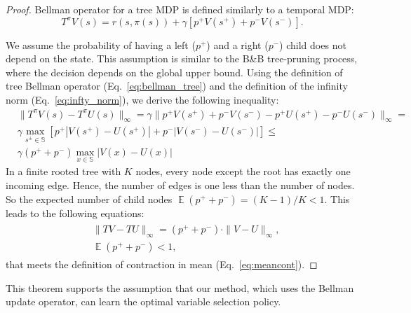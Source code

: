 \documentclass[preprint,12pt]{elsarticle} %
\theoremstyle{plain}
\theoremstyle{definition}
\theoremstyle{remark}
\newcommand{\ex}{\mathop{\mathbb{E}}}
\begin{document}
\begin{proof}
Bellman operator for a tree MDP is defined similarly to a temporal MDP:
\begin{equation}
    T^{\pi}V(s) = r(s, \pi(s)) + \gamma \left[ p^+V(s^{+}) + p^-V(s^{-}) \right]. \label{eq:bellman_tree}
\end{equation}

We assume the probability of having a left ($p^+$) and a right ($p^-$) child does not depend on the state. This assumption is similar to the B\&B tree-pruning process, where the decision depends on the global upper bound. Using the definition of tree Bellman operator (Eq.~\ref{eq:bellman_tree}) and the definition of the infinity norm (Eq.~\ref{eq:infty_norm}), we derive the following inequality:
\begin{align*}
    & \|T^{\pi}V(s) - T^{\pi}U(s)\|_{\infty} = \gamma \| p^+V(s^{+}) + p^-V(s^{-})  - p^+U(s^{+}) - p^-U(s^{-})\|_{\infty} = \\
    & \gamma \max_{s^{\pm} \in \mathbb{S}}\left[p^+|V(s^{+}) - U(s^{+})| + p^-|V(s^{-}) - U(s^{-})|\right] \leq  \\
    & \gamma (p^+ + p^-)\max_{x \in \mathbb{S}}|V(x) - U(x)|
\end{align*}
In a finite rooted tree with $K$ nodes, every node except the root has exactly one incoming edge. Hence, the number of edges is one less than the number of nodes. So the expected number of child nodes $\ex(p^+ + p^-) = (K - 1)/K < 1$. This leads to the following equations:
\begin{align*}
\begin{split}
    & \|TV - TU\|_{\infty} =(p^+ + p^-) \cdot \|V - U\|_{\infty},\\
    & \ex (p^+ + p^-) < 1,
\end{split}
\end{align*}
that meets the definition of contraction in mean (Eq.~\ref{eq:meancont}).

\end{proof}

This theorem supports the assumption that our method, which uses the Bellman update operator, can learn the optimal variable selection policy.
\end{document}
